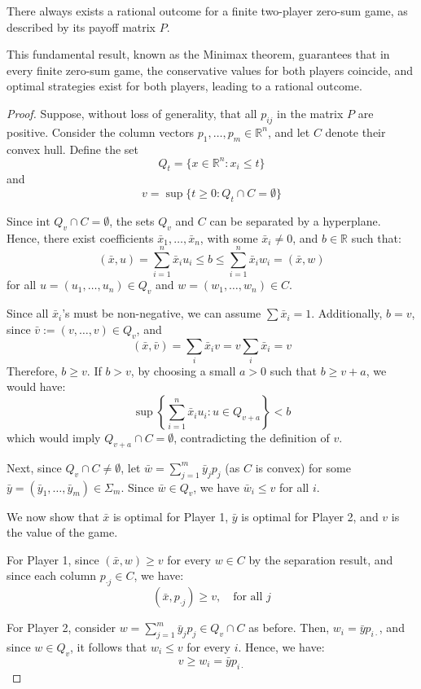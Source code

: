 \begin{theorem}
    There always exists a rational outcome for a finite two-player zero-sum game, as described by its payoff matrix $P$.
\end{theorem}
This fundamental result, known as the Minimax theorem, guarantees that in every finite zero-sum game, the conservative values for both players coincide, and optimal strategies exist for both players, leading to a rational outcome.
\begin{proof}
    Suppose, without loss of generality, that all $p_{ij}$ in the matrix $P$ are positive. 
    Consider the column vectors $p_1, \dots, p_m \in \mathbb{R}^n$, and let $C$ denote their convex hull. 
    Define the set
    \[Q_t = \{x \in \mathbb{R}^n : x_i \leq t \}\]
    and
    \[v = \sup \{t \geq 0 : Q_t \cap C = \emptyset \}\]
    
    Since $\text{int } Q_v \cap C = \emptyset$, the sets $Q_v$ and $C$ can be separated by a hyperplane. 
    Hence, there exist coefficients $\bar{x}_1, \dots, \bar{x}_n$, with some $\bar{x}_i \neq 0$, and $b \in \mathbb{R}$ such that:
    \[(\bar{x}, u) = \sum_{i=1}^{n} \bar{x}_i u_i \leq b \leq \sum_{i=1}^{n} \bar{x}_i w_i = (\bar{x}, w)\]
    for all $u = (u_1, \dots, u_n) \in Q_v$ and $w = (w_1, \dots, w_n) \in C$.
    
    Since all $\bar{x}_i$'s must be non-negative, we can assume $\sum \bar{x}_i = 1$. 
    Additionally, $b = v$, since $\bar{v} := (v, \dots, v) \in Q_v$, and
    \[(\bar{x}, \bar{v}) = \sum_i \bar{x}_i v = v \sum_i \bar{x}_i = v\]
    Therefore, $b \geq v$. 
    If $b > v$, by choosing a small $a > 0$ such that $b \geq v + a$, we would have:
    \[\sup \left\{\sum_{i=1}^{n} \bar{x}_i u_i : u \in Q_{v + a} \right\} < b\]
    which would imply $Q_{v + a} \cap C = \emptyset$, contradicting the definition of $v$.
    
    Next, since $Q_v \cap C \neq \emptyset$, let $\bar{w} = \sum_{j=1}^{m} \bar{y}_j p_j$ (as $C$ is convex) for some $\bar{y} = (\bar{y}_1, \dots, \bar{y}_m) \in \Sigma_m$. 
    Since $\bar{w} \in Q_v$, we have $\bar{w}_i \leq v$ for all $i$.
    
    We now show that $\bar{x}$ is optimal for Player 1, $\bar{y}$ is optimal for Player 2, and $v$ is the value of the game. 
    
    For Player 1, since $(\bar{x}, w) \geq v$ for every $w \in C$ by the separation result, and since each column $p_{\cdot j} \in C$, we have:
    \[(\bar{x}, p_{\cdot j}) \geq v, \quad \text{for all } j\]
    
    For Player 2, consider $w = \sum_{j=1}^{m} \bar{y}_j p_j \in Q_v \cap C$ as before. 
    Then, $w_i = \bar{y} p_{i \cdot}$, and since $w \in Q_v$, it follows that $w_i \leq v$ for every $i$. 
    Hence, we have:
    \[v \geq w_i = \bar{y} p_{i \cdot}\]
\end{proof}
